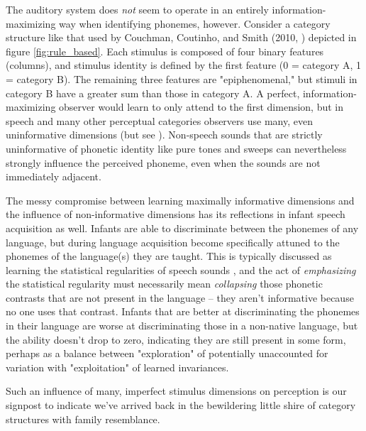 The auditory system does \textit{not} seem to operate in an entirely information-maximizing way when identifying phonemes, however. Consider a category structure like that used by Couchman, Coutinho, and Smith (2010, \citep{couchmanRulesResemblanceTheir2010}) depicted in figure \ref{fig:rule_based}. Each stimulus is composed of four binary features (columns), and stimulus identity is defined by the first feature (0 = category A, 1 = category B). The remaining three features are "epiphenomenal," but stimuli in category B have a greater sum than those in category A. A perfect, information-maximizing observer would learn to only attend to the first dimension, but in speech and many other perceptual categories observers use many, even uninformative dimensions\citep{couchmanRulesResemblanceTheir2010,roschFamilyResemblancesStudies1975} (but see \citep{leaUseMultipleDimensions2008}). Non-speech sounds that are strictly uninformative of phonetic identity like pure tones and sweeps can nevertheless strongly influence the perceived phoneme\citep{holtNeighboringSpectralContent2000,holtMeanMattersEffects2006}, even when the sounds are not immediately adjacent\citep{holtTemporallyNonadjacentNonlinguistic2005}. 

The messy compromise between learning maximally informative dimensions and the influence of non-informative dimensions has its reflections in infant speech acquisition as well. Infants are able to discriminate between the phonemes of any language, but during language acquisition become specifically attuned to the phonemes of the language(s) they are taught. This is typically discussed as learning the statistical regularities of speech sounds \citep{kuhlPhoneticLearningPathway2008,kuhlEarlyLanguageAcquisition2004}, and the act of \textit{emphasizing} the statistical regularity must necessarily mean \textit{collapsing} those phonetic contrasts that are not present in the language -- they aren't informative because no one uses that contrast. Infants that are better at discriminating the phonemes in their language are worse at discriminating those in a non-native language\citep{kuhlPhoneticLearningPathway2008}, but the ability doesn't drop to zero, indicating they are still present in some form, perhaps as a balance between "exploration" of potentially unaccounted for variation with "exploitation" of learned invariances. 

Such an influence of many, imperfect stimulus dimensions on perception is our signpost to indicate we've arrived back in the bewildering little shire of category structures with family resemblance.
